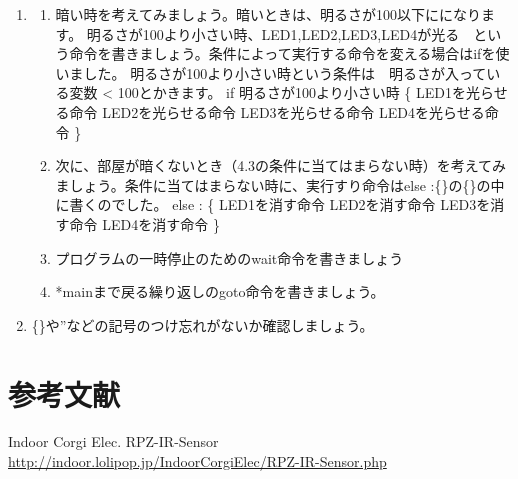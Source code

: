 \documentclass[a4paper,dvipdfmx]{jarticle}
\newcounter{saveenum}
\begin{document}
\bigskip

\setcounter{saveenum}{\value{enumi}}
\begin{enumerate}
\setcounter{enumi}{\value{saveenum}}
\item \setcounter{saveenum}{\value{enumii}}
\begin{enumerate}
\setcounter{enumii}{\value{saveenum}}
\item \clearpage
暗い時を考えてみましょう。暗いときは、明るさが100以下にになります。\newline
明るさが100より小さい時、LED1,LED2,LED3,LED4が光る　という命令を書きましょう。条件によって実行する命令を変える場合はifを使いました。\newline
明るさが100より小さい時という条件は　明るさが入っている変数
{\textless} 100とかきます。\newline
if 明るさが100より小さい時 \{\newline
LED1を光らせる命令\newline
LED2を光らせる命令\newline
LED3を光らせる命令\newline
LED4を光らせる命令\newline
\}
\item
次に、部屋が暗くないとき（4.3の条件に当てはまらない時）を考えてみましょう。条件に当てはまらない時に、実行すり命令はelse
:\{\}の\{\}の中に書くのでした。\newline
else : \{\newline
LED1を消す命令\newline
LED2を消す命令\newline
LED3を消す命令\newline
LED4を消す命令\newline
\}
\item
プログラムの一時停止のためのwait命令を書きましょう
\item
*mainまで戻る繰り返しのgoto命令を書きましょう。
\end{enumerate}
\item
\{\}や''などの記号のつけ忘れがないか確認しましょう。
\end{enumerate}
\section{参考文献}
Indoor Corgi Elec. RPZ-IR-Sensor \url{http://indoor.lolipop.jp/IndoorCorgiElec/RPZ-IR-Sensor.php}
\end{document}
